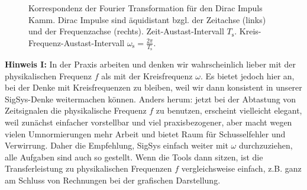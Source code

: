 \begin{figure}[h!]
\centering
%
%
%
%
\caption{Korrespondenz der Fourier Transformation für den Dirac Impuls Kamm.
Dirac Impulse sind äquidistant bzgl. der Zeitachse (links) und
der Frequenzachse (rechts). Zeit-Austast-Intervall $T_\mathrm{s}$.
Kreis-Frequenz-Austast-Intervall $\omega_\textrm{s}=\frac{2\pi}{T_\mathrm{s}}$.}
\label{fig:DiracImpulsKammSkizze}
\end{figure}


\textbf{Hinweis I:} In der Praxis arbeiten und denken wir wahrscheinlich
lieber mit der physikalischen
Frequenz $f$ als mit der Kreisfrequenz $\omega$. Es bietet jedoch hier an, bei der Denke
mit Kreisfrequenzen zu bleiben, weil wir dann konsistent in unserer SigSys-Denke
weitermachen können. Anders herum: jetzt bei der Abtastung von Zeitsignalen
die physikalische Frequenz $f$ zu benutzen, erscheint vielleicht elegant,
weil zunächst einfacher vorstellbar und viel praxisbezogener,
aber macht wegen vielen Umnormierungen mehr Arbeit und bietet Raum für
Schusselfehler und Verwirrung.
Daher die Empfehlung, SigSys einfach weiter mit $\omega$ durchzuziehen,
alle Aufgaben sind auch so gestellt. Wenn die Tools dann sitzen, ist die
Transferleistung zu physikalischen Frequenzen $f$ vergleichsweise einfach, z.B.
ganz am Schluss von Rechnungen bei der grafischen Darstellung.


